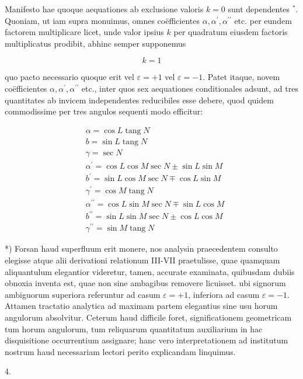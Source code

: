 \documentclass[twoside,12pt, showframe]{memoir}
\begin{document}
Manifesto hae quoque aequationes ab exclusione valoris \(k=0\) sunt dependentes \({ }^{*}\). Quoniam, ut iam supra monuimus, omnes coëfficientes \(\alpha, \alpha^{\prime}, \alpha^{\prime \prime}\) etc. per eundem factorem multiplicare licet, unde valor ipsius \(k\) per quadratum eiusdem factoris multiplicatus prodibit, abhinc semper supponemus

\[
k=1
\]

quo pacto necessario quoque erit vel \(\varepsilon=+1\) vel \(\varepsilon=-1\). Patet itaque, novem coëfficientes \(\alpha, \alpha^{\prime}, \alpha^{\prime \prime}\) etc., inter quos sex aequationes conditionales adsunt, ad tres quantitates ab invicem independentes reducibiles esse debere, quod quidem commodissime per tres angulos sequenti modo efficitur:

\[
\begin{aligned}
& \alpha=\cos L \operatorname{tang} N \\
& b=\sin L \operatorname{tang} N \\
& \gamma=\sec N \\
& \alpha^{\prime}=\cos L \cos M \sec N \pm \sin L \sin M \\
& b^{\prime}=\sin L \cos M \sec N \mp \cos L \sin M \\
& \gamma^{\prime}=\cos M \operatorname{tang} N \\
& \alpha^{\prime \prime}=\cos L \sin M \sec N \mp \sin L \cos M \\
& b^{\prime \prime}=\sin L \sin M \sec N \pm \cos L \cos M \\
& \gamma^{\prime \prime}=\sin M \operatorname{tang} N
\end{aligned}
\]

*) Forsan haud superfluum erit monere, nos analysin praecedentem consulto elegisse atque alii derivationi relationum III-VII praetulisse, quae quamquam aliquantulum elegantior videretur, tamen, accurate examinata, quibusdam dubiis obnoxia inventa est, quae non sine ambagibus removere licuisset.
ubi signorum ambiguorum superiora referuntur ad casum \(\varepsilon=+1\), inferiora ad casum \(\varepsilon=-1\). Attamen tractatio analytica ad maximam partem elegantius sine usu horum angulorum absolvitur. Ceterum haud difficile foret, significationem geometricam tum horum angulorum, tum reliquarum quantitatum auxiliarium in hac disquisitione occurrentium assignare; hanc vero interpretationem ad institutum nostrum haud necessariam lectori perito explicandam linquimus.

4.
\end{document}
